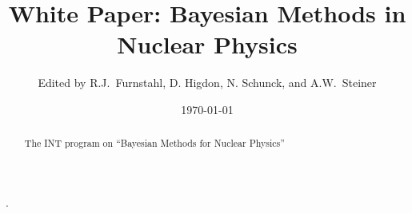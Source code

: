 \documentclass[12pt]{article}
\begin{document}
\title{White Paper: Bayesian Methods in Nuclear Physics}

\author{Edited by R.J.\ Furnstahl, D. Higdon, N. Schunck, and A.W.\ Steiner}

\date{\today\vspace {1.8in}}

\maketitle

\begin{abstract}
	The INT program on ``Bayesian Methods for Nuclear Physics''
\end{abstract}

\newpage

.


\setcounter{tocdepth}{2}
\tableofcontents{}

\newpage









\clearpage

\appendix








\clearpage
{}
  

\end{document}
